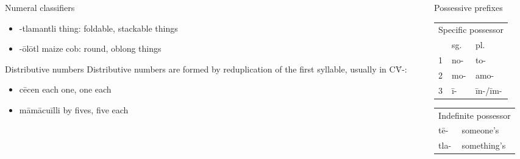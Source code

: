 \documentclass[12pt]{beamer}
\newcommand{\nah}[1]{\textcolor{nahgrn}{#1}}
\newcommand{\trs}[1]{\textcolor{nahblu}{#1}}
\begin{document}
\begin{frame}
\begin{columns}[t]
\begin{column}{.20\linewidth}
\begin{block}{Numeral classifiers}
\begin{itemize}
          \item \nah{-tlamantli} \trs{thing}: foldable, stackable things
          \item \nah{-ōlōtl} \trs{maize cob}: round, oblong things
        \end{itemize}
      \end{block}
      \begin{block}{Distributive numbers}
        Distributive numbers are formed by reduplication of the first syllable, usually in \nah{C\=V-}:
        \begin{itemize}
          \item \nah{cēcen} \trs{each one, one each}
          \item \nah{māmācuīlli} \trs{by fives, five each}
        \end{itemize}
      \end{block}
    \end{column}

    \begin{column}{.23\linewidth}
      \begin{block}{Possessive prefixes}
        \begin{tabular}[t]{lll}
          \multicolumn{3}{c}{Specific possessor} \\
            & sg.       & pl.                    \\
          1 & \nah{no-} & \nah{to-}              \\
          2 & \nah{mo-} & \nah{amo-}             \\
          3 & \nah{ī-}  & \nah{īn-/īm-}          \\
        \end{tabular}
        \qquad
        \begin{tabular}[t]{ll}
          \multicolumn{2}{c}{Indefinite possessor} \\
          \nah{tē-}  & \trs{someone's}             \\
          \nah{tla-} & \trs{something's}
        \end{tabular}
      \end{block}


\end{column}
\end{columns}
\end{frame}
\end{document}
